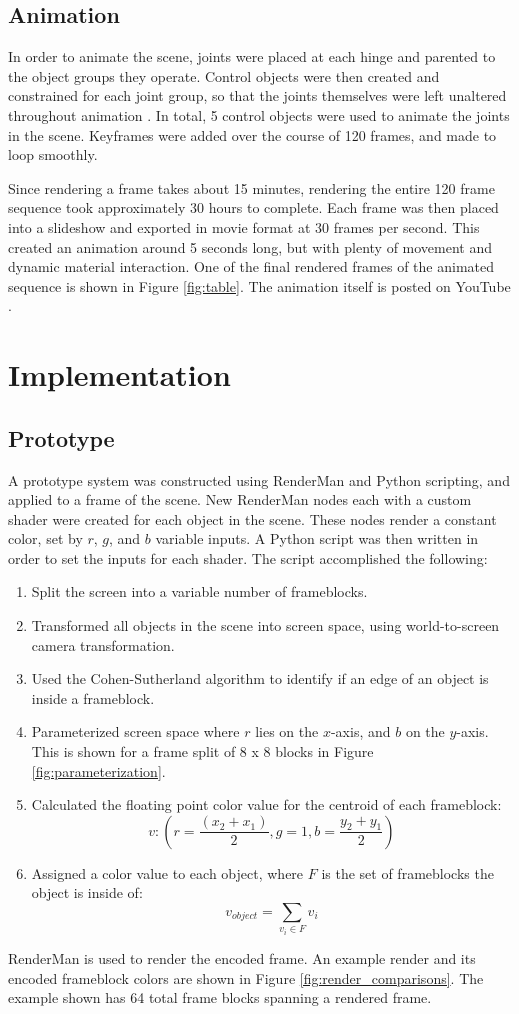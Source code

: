 \documentclass[conference]{IEEEtran}
\begin{document}
\subsection{Animation}
In order to animate the scene, joints were placed at each hinge and parented to the object groups they operate.
Control objects were then created and constrained for each joint group,
so that the joints themselves were left unaltered throughout animation \cite{rigging}.
In total, 5 control objects were used to animate the joints in the scene.
Keyframes were added over the course of 120 frames, and made to loop smoothly.

Since rendering a frame takes about 15 minutes,
rendering the entire 120 frame sequence took approximately 30 hours to complete.
Each frame was then placed into a slideshow and exported in movie format at 30 frames per second.
This created an animation around 5 seconds long,
but with plenty of movement and dynamic material interaction.
One of the final rendered frames of the animated sequence is shown in Figure \ref{fig:table}.
The animation itself is posted on YouTube \cite{animation}.

\section{Implementation}

\subsection{Prototype}
A prototype system was constructed using RenderMan
and Python scripting, and applied to a frame of the scene.
New RenderMan nodes each with a custom shader were created for each object in the scene.
These nodes render a constant color, set by $r$, $g$, and $b$ variable inputs.
A Python script was then written in order to set the inputs for each shader.
The script accomplished the following:
\bigskip
\begin{enumerate}
\item Split the screen into a variable number of frameblocks.
\item Transformed all objects in the scene into screen space, using world-to-screen camera transformation.
\item Used the Cohen-Sutherland algorithm to identify if an edge of an object is inside a frameblock.
\item Parameterized screen space where $r$ lies on the $x$-axis, and $b$ on the $y$-axis.
This is shown for a frame split of 8 x 8 blocks in Figure \ref{fig:parameterization}.
\item Calculated the floating point color value for the centroid of each frameblock:
$$v : (r=\frac{(x_2 + x_1)}{2}, g=1, b=\frac{y_2 + y_1}{2})$$
\item Assigned a color value to each object, where
$F$ is the set of frameblocks the object is inside of:
$$v_{object} = \sum_{v_i\in F}v_i$$
\end{enumerate}
\bigskip
RenderMan is used to render the encoded frame.
An example render and its encoded frameblock colors are shown in Figure \ref{fig:render_comparisons}.
The example shown has 64 total frame blocks spanning a rendered frame.
\end{document}
